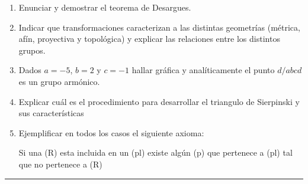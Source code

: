 \documentclass[9pt,a4paper]{extarticle}
\begin{document}
\begin{enumerate}

\item Enunciar y demostrar el teorema de Desargues.

\item Indicar que transformaciones caracterizan a las distintas geometrías (métrica, afín, proyectiva y topológica) y explicar las relaciones entre los distintos grupos.

\item Dados $a=-5$, $b=2$ y $c=-1$ hallar gráfica y analíticamente el punto $d / abcd$ es un grupo armónico.

\item Explicar cuál es el procedimiento para desarrollar el triangulo de Sierpinski y sus características 

\item Ejemplificar en todos los casos el siguiente axioma: 

Si una (R) esta incluida en un (pl) existe algún (p) que pertenece a (pl) tal que no pertenece a (R)

\end{enumerate}
\hrule
\end{document}
